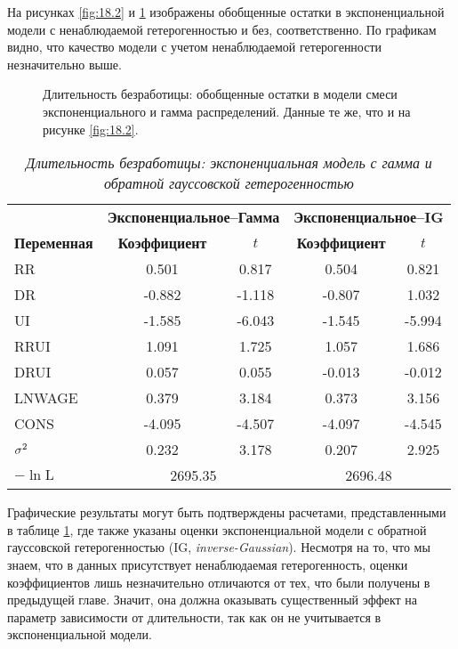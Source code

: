На рисунках \ref{fig:18.2} и \ref{fig:18.3} изображены обобщенные остатки в экспоненциальной модели с ненаблюдаемой гетерогенностью и без, соответственно. По графикам видно, что качество модели с учетом ненаблюдаемой гетерогенности незначительно выше.
    \begin{figure}[ht!]\caption{Длительность безработицы: обобщенные остатки в модели смеси экспоненциального и гамма распределений. Данные те же, что и на рисунке \ref{fig:18.2}.}\label{fig:18.3}
    \centering
    \end{figure}

    \begin{table}[!htbp]\caption{\textit{Длительность безработицы: экспоненциальная модель с гамма и обратной гауссовской гетерогенностью}}\label{tab:18.1}
    \begin{center}
\begin{tabular}{lcccc}
\hline \hline
&\multicolumn{2}{c}{\textbf{Экспоненциальное--Гамма}}&\multicolumn{2}{c}{\textbf{Экспоненциальное--IG}}\\
\cmidrule(r){2-3}\cmidrule(r){4-5}
\textbf{Переменная} &\textbf{Коэффициент}   &$t$      &\textbf{Коэффициент}   &$t$ \\
\hline
RR                  &0.501  &0.817  &0.504  &0.821 \\
DR                  &-0.882 &-1.118 &-0.807 &1.032 \\
UI                  &-1.585 &-6.043 &-1.545 &-5.994 \\
RRUI                &1.091  &1.725  &1.057  &1.686 \\
DRUI                &0.057  &0.055  &-0.013 &-0.012 \\
LNWAGE              &0.379  &3.184  &0.373  &3.156 \\
CONS                &-4.095 &-4.507 &-4.097 &-4.545 \\
$\sigma^2$              &0.232  &3.178  &0.207  &2.925 \\
$-\ln\textrm{L}$    &\multicolumn{2}{c}{2695.35}&\multicolumn{2}{c}{2696.48} \\
\hline \hline
\end{tabular}
    \end{center}
    \end{table}

Графические результаты могут быть подтверждены расчетами, представленными в таблице \ref{tab:18.1}, где также указаны оценки экспоненциальной модели с обратной гауссовской гетерогенностью (IG, \textit{inverse-Gaussian}). Несмотря на то, что мы знаем, что в данных присутствует ненаблюдаемая гетерогенность, оценки коэффициентов лишь незначительно отличаются от тех, что были получены в предыдущей главе. Значит, она должна оказывать существенный эффект на параметр зависимости от длительности, так как он не учитывается в экспоненциальной модели.

